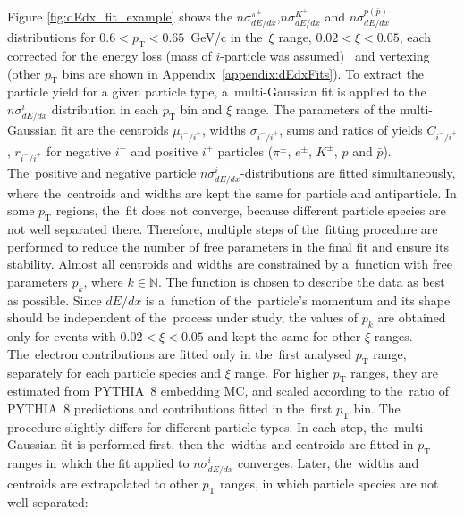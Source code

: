 \noindent Figure \ref{fig:dEdx_fit_example}
shows the $n\sigma^{\pi^\pm}_{dE/dx}$,$n\sigma^{K^\pm}_{dE/dx}$ and $n\sigma^{p(\bar{p})}_{dE/dx}$ distributions for  $0.6 < p_\textrm{T} < 0.65$~GeV/c  in the~$\xi$ range, $0.02 < \xi < 0.05$, each corrected for the energy loss (mass of $i$-particle was assumed)~\cite{supplementaryNote} and vertexing  (other $p_\textrm{T}$ bins are shown in Appendix~\ref{appendix:dEdxFits}). To extract the  particle yield for a given particle type,
a~multi-Gaussian fit is applied to the $n\sigma^i_{dE/dx}$ distribution in each $p_\textrm{T}$ bin and $\xi$ range. The parameters of the multi-Gaussian fit are the centroids $\mu_{i^-/i^+}$, widths $\sigma_{i^-/i^+}$, sums  and ratios  of yields $C_{i^-/i^+}$, $r_{i^-/i^+}$ for negative $i^-$ and positive $i^+$ particles ($\pi^\pm$, $e^\pm$, $K^\pm$, $p$ and $\bar{p}$). The~positive and negative particle
$n\sigma^{i}_{dE/dx}$-distributions are fitted simultaneously, where the~centroids and widths are kept the same for particle
and antiparticle. 
In some $p_\textrm{T}$ regions, the~fit does not converge,
because different particle species are not well separated  there. Therefore, multiple steps of the~fitting procedure  are performed to reduce the number of free parameters in the final fit and ensure its stability. Almost all centroids and widths are constrained  by a~function with free parameters $p_k$, where $k \in \mathbb N$.  The function is chosen to describe the data as best as possible.
Since $dE/dx$ is a~function of the~particle's momentum and its shape should be independent of the~process under study, the values of $p_k$  are obtained only for events with $0.02 < \xi < 0.05$ and kept the same for other $\xi$ ranges. 
The~electron contributions are  fitted only in the~first analysed $p_\textrm{T}$ range, separately for each particle species and $\xi$ range. For higher $p_\text{T}$ ranges, they are estimated from PYTHIA~8 embedding MC, and scaled according to the~ratio of PYTHIA~8 predictions and  contributions fitted in the~first $p_\textrm{T}$ bin.
The procedure slightly differs for different particle types. In each step, the~multi-Gaussian fit is performed first, then the~widths and centroids are fitted  in  $p_\textrm{T}$ ranges in which the fit applied to $n\sigma^{i}_{dE/dx}$ converges. Later,  the~widths and centroids are extrapolated to other $p_\textrm{T}$ ranges, in which particle species are not well separated:
